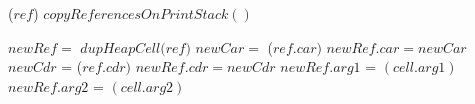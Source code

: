 \documentclass[9pt]{article}
\begin{document}
\begin{function*}
\SetStartEndCondition{ }{}{}%
%
%
%
\newcommand{\forcond}{$i$ \KwTo\Range{$n$}}
\AlgoDontDisplayBlockMarkers\SetAlgoNoEnd\SetAlgoNoLine%
%
%
\Fn{\Lgc{}}
 {
   {\Copy($\mathit{ref}$)\;}
  $\mathit{copyReferencesOnPrintStack()}$\;  
}

{
       {$\mathit{newRef} = $  $\mathit{dupHeapCell(ref})$\;
        {
               {
                 $\mathit{newCar}  = $  \Copy($\mathit{ref\!.car})$\;
                 $\mathit{newRef.car}   =  newCar$\;
               }
               {
                 $\mathit{newCdr}$ =   \Copy($\mathit{ref.cdr})$\;
                 $\mathit{newRef.cdr}   = \mathit{newCdr}$\;
               }    
        }
          {
             $\mathit{newRef.arg1}$ =  \Copy$\mathit{(cell.arg1)}$\;
             $\mathit{newRef.arg2}$ =  \Copy$\mathit{(cell.arg2)}$\;
          }
}} 
\end{function*}
\end{document}
